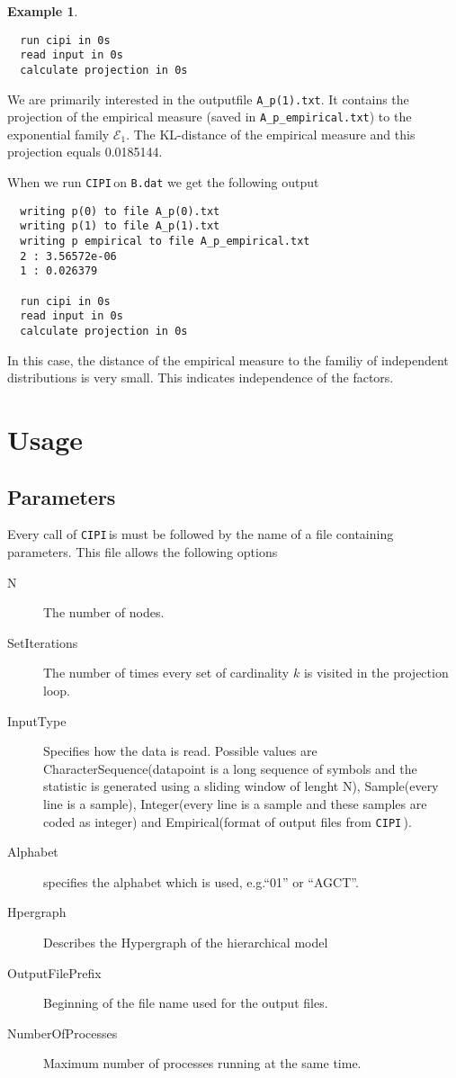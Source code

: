\documentclass[12pt]{amsart}
\newcommand{\eg}{e.g.\;}  %
\newcommand{\cipi}{\texttt{CIPI}\,}
\theoremstyle{plain}%
\theoremstyle{definition}
\newtheorem{exmp}[thm]{Example}
\theoremstyle{remark}
\begin{document}
\begin{exmp}
\begin{verbatim}
  run cipi in 0s
  read input in 0s
  calculate projection in 0s
\end{verbatim} We are
  primarily interested in the outputfile \texttt{A\_p(1).txt}. It contains the
  projection of the empirical measure (saved in \texttt{A\_p\_empirical.txt}) to
  the exponential family $\mathcal{E}_1$. The KL-distance of the empirical
  measure and this projection equals 0.0185144.
  
  When we run \cipi on \texttt{B.dat} we get the following output
  \begin{verbatim}
  writing p(0) to file A_p(0).txt
  writing p(1) to file A_p(1).txt
  writing p empirical to file A_p_empirical.txt
  2 : 3.56572e-06
  1 : 0.026379

  run cipi in 0s
  read input in 0s
  calculate projection in 0s
  \end{verbatim}

  In this case, the distance of the empirical measure to the familiy of
  independent distributions is very small. This indicates independence of the
  factors. 
\end{exmp}

\section{Usage}
\label{sec:usage}
\subsection{Parameters}
Every call of \cipi is must be followed by the name of a file containing parameters. This file
allows the following options
\begin{description}
  \item[N] The number of nodes.
  \item[SetIterations] The number of times every set of cardinality $k$ is visited in the projection
    loop.
  \item[InputType] Specifies how the data is read. Possible values are CharacterSequence(datapoint
    is a long sequence of symbols and the statistic is generated using a sliding window of lenght
    N), Sample(every line is a sample), Integer(every line is a sample and these samples are coded
    as integer) and Empirical(format of output files from \cipi).
  \item[Alphabet] specifies the alphabet which is used, \eg ``01'' or ``AGCT''.
  \item[Hpergraph] Describes the Hypergraph of the hierarchical model
  \item[OutputFilePrefix] Beginning of the file name used for the output files. 
  \item[NumberOfProcesses] Maximum number of processes running at the same time. 
\end{description}
\end{document}
